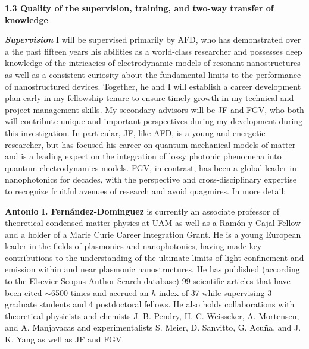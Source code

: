 \documentclass[11pt,a4paper]{article}
\begin{document}
\noindent\textbf{1.3 Quality of the supervision, training, and two-way transfer of knowledge}

\textbf{\textit{Supervision}} I will be supervised primarily by AFD, who has demonstrated over a the past fifteen years his abilities as a world-class researcher and possesses deep knowledge of the intricacies of electrodynamic models of resonant nanostructures\supercite{cuartero-gonzalez_dipolar_2020} as well as a consistent curiosity about the fundamental limits to the performance of nanostructured devices.\supercite{fernandez-dominguez_transformation-optics_2012,fernandez-dominguez_vanishing_2021} Together, he and I will establish a career development plan early in my fellowship tenure to ensure timely growth in my technical and project management skills. My secondary advisors will be JF and FGV, who both will contribute unique and important perspectives during my development during this investigation. In particular, JF, like AFD, is a young and energetic researcher, but has focused his career on quantum mechanical models of matter and is a leading expert on the integration of lossy photonic phenomena into quantum electrodynamics models.\supercite{feist_macroscopic_2020} FGV, in contrast, has been a global leader in nanophotonics for decades, with the perspective and cross-disciplinary expertise to recognize fruitful avenues of research and avoid quagmires. In more detail:

\textbf{Antonio I. Fern\'{a}ndez-Dominguez} is currently an associate professor of theoretical condensed matter physics at UAM as well as a Ram\'{o}n y Cajal Fellow and a holder of a Marie Curie Career Integration Grant. He is a young European leader in the fields of plasmonics and nanophotonics, having made key contributions to the understanding of the ultimate limits of light confinement and emission within and near plasmonic nanostructures. He has published (according to the Elsevier Scopus Author Search database) 99 scientific articles that have been cited $\sim$6500 times and accrued an $h$-index of 37 while supervising 3 graduate students and 4 postdoctoral fellows. He also holds collaborations with theoretical physicists and chemists J. B. Pendry, H.-C. Weisseker, A. Mortensen, and A. Manjavacas and experimentalists S. Meier, D. Sanvitto, G. Acu\~{n}a, and J. K. Yang as well as JF and FGV.
\end{document}
